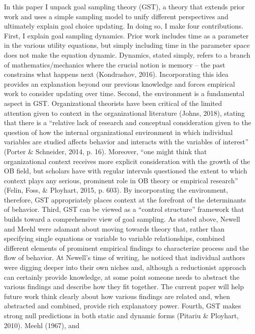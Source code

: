 \documentclass[english,,man]{apa6}
\theoremstyle{definition}
\theoremstyle{definition}
\theoremstyle{definition}
\theoremstyle{remark}
\begin{document}
In this paper I unpack goal sampling theory (GST), a theory that extends
prior work and uses a simple sampling model to unify different
perspectives and ultimately explain goal choice updating. In doing so, I
make four contributions. First, I explain goal sampling dynamics. Prior
work includes time as a parameter in the various utility equations, but
simply including time in the parameter space does not make the equation
dynamic. Dynamics, stated simply, refers to a branch of
mathematics/mechanics where the crucial notion is memory -- the past
constrains what happens next (Kondrashov, 2016). Incorporating this idea
provides an explanation beyond our previous knowledge and forces
empirical work to consider updating over time. Second, the environment
is a fundamental aspect in GST. Organizational theorists have been
critical of the limited attention given to context in the organizational
literature (Johns, 2018), stating that there is a \enquote{relative lack
of research and conceptual consideration given to the question of how
the internal organizational environment in which individual variables
are studied affects behavior and interacts with the variables of
interest} (Porter \& Schneider, 2014, p. 16). Moreover, \enquote{one
might think that organizational context receives more explicit
consideration with the growth of the OB field, but scholars have with
regular intervals questioned the extent to which context plays any
serious, prominent role in OB theory or empirical research} (Felin,
Foss, \& Ployhart, 2015, p. 603). By incorporating the environment,
therefore, GST appropriately places context at the forefront of the
determinants of behavior. Third, GST can be viewed as a \enquote{control
structure} framework that builds toward a comprehensive view of goal
sampling. As stated above, Newell and Meehl were adamant about moving
towards theory that, rather than specifying single equations or variable
to variable relationships, combined different elements of prominent
empirical findings to characterize process and the flow of behavior. At
Newell's time of writing, he noticed that individual authors were
digging deeper into their own niches and, although a reductionist
approach can certainly provide knowledge, at some point someone needs to
abstract the various findings and describe how they fit together. The
current paper will help future work think clearly about how various
findings are related and, when abstracted and combined, provide rich
explanatory power. Fourth, GST makes strong null predictions in both
static and dynamic forms (Pitariu \& Ployhart, 2010). Meehl (1967), and
\end{document}
